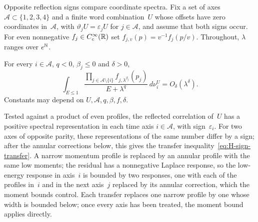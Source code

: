 Opposite reflection signs compare coordinate spectra. Fix a set of axes $\mathcal A\subset\{1,2,3,4\}$ and a finite word combination~$U$ whose offsets have zero coordinates in~$\mathcal A$, with $\vartheta_jU=\varepsilon_jU$ for $j\in\mathcal A$, and assume that both signs occur. For even nonnegative $f_j\in C_c^\infty(\mathbb{R})$ set $f_{j,v}(p)=v^{-1}f_j(p/v)$. Throughout, $\lambda$ ranges over $e^{\mathbb{N}}$.
\begin{lemma}\label{lem:H-coordinate-signs}
For every $i\in\mathcal A$, $q<0$, $\beta_j\le0$ and $\delta>0$,
\begin{equation*}
\int_{E\le1}\frac{\prod_{j\in\mathcal A\setminus\{i\}}f_{j,\lambda^{\beta_j}}(p_j)}{E+\lambda^q}\,d\nu_i^U
=O_\delta(\lambda^\delta).
\end{equation*}
Constants may depend on $U,\mathcal A,q,\beta,f,\delta$.
\end{lemma}
Tested against a product of even profiles, the reflected correlation of~$U$ has a positive spectral representation in each time axis $i\in\mathcal A$, with sign~$\varepsilon_i$. For two axes of opposite parity, these representations of the same number differ by a sign; after the annular corrections below, this gives the transfer inequality~\eqref{eq:H-sign-transfer}. A narrow momentum profile is replaced by an annular profile with the same low moments; the residual has a nonnegative Laplace response, so the low-energy response in axis~$i$ is bounded by two responses, one with each of the profiles in~$i$ and in the next axis~$j$ replaced by its annular correction, which the moment bounds control. Each transfer replaces one narrow profile by one whose width is bounded below; once every axis has been treated, the moment bound applies directly.
